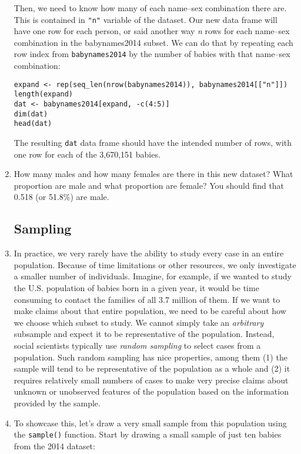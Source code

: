 \documentclass[a4paper,12pt]{article}
\begin{document}
\begin{enumerate}
\noindent Then, we need to know how many of each name--sex combination there are. This is contained in \texttt{"n"} variable of the dataset. Our new data frame will have one row for each person, or said another way \textit{n} rows for each name--sex combination in the babynames2014 subset. We can do that by repeating each row index from \texttt{babynames2014} by the number of babies with that name--sex combination:

\begin{verbatim}
expand <- rep(seq_len(nrow(babynames2014)), babynames2014[["n"]])
length(expand)
dat <- babynames2014[expand, -c(4:5)]
dim(dat)
head(dat)
\end{verbatim}

\noindent The resulting \texttt{dat} data frame should have the intended number of rows, with one row for each of the 3,670,151 babies.

\item How many males and how many females are there in this new dataset? What proportion are male and what proportion are female? You should find that 0.518 (or 51.8\%) are male.

\subsection{Sampling}

\item In practice, we very rarely have the ability to study every case in an entire population. Because of time limitations or other resources, we only investigate a smaller number of individuals. Imagine, for example, if we wanted to study the U.S. population of babies born in a given year, it would be time consuming to contact the families of all 3.7 million of them. If we want to make claims about that entire population, we need to be careful about how we choose which subset to study. We cannot simply take an \textit{arbitrary} subsample and expect it to be representative of the population. Instead, social scientists typically use \textit{random sampling} to select cases from a population. Such random sampling has nice properties, among them (1) the sample will tend to be representative of the population as a whole and (2) it requires relatively small numbers of cases to make very precise claims about unknown or unobserved features of the population based on the information provided by the sample.

\item To showcase this, let's draw a very small sample from this population using the \texttt{sample()} function. Start by drawing a small sample of just ten babies from the 2014 dataset:


\end{enumerate}
\end{document}
